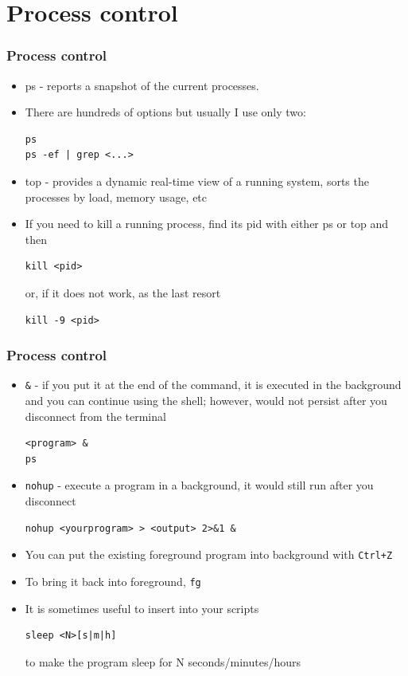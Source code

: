 \documentclass{beamer}
\begin{document}
\section{Process control}
\begin{frame}[fragile]
  \frametitle{Process control}
\begin{itemize}
\item  {\color{mycolorcli}ps} - reports a snapshot of the current processes.
\item There are hundreds of options but usually I use only two:
{\color{mycolorcli}
\begin{verbatim}
ps
ps -ef | grep <...>
\end{verbatim}
}
\item  {\color{mycolorcli}top} - provides a dynamic real-time view of a running system, sorts the processes by load, memory usage, etc
\item If you need to kill a running process, find its pid with either {\color{mycolorcli}ps} or 
{\color{mycolorcli}top} and then
{\color{mycolorcli}
\begin{verbatim}
kill <pid>
\end{verbatim}
}
or, if it does not work, as the last resort 
{\color{mycolorcli}
\begin{verbatim}
kill -9 <pid>
\end{verbatim}
}
\end{itemize}
\end{frame}

\begin{frame}[fragile]
  \frametitle{Process control}
\begin{itemize}
\item {\color{mycolorcli}\verb|&|} - if you put it at the end of the command, it is executed in the background and you can continue using the shell; however, would not persist after you disconnect from the terminal
{\color{mycolorcli}
\begin{verbatim}
<program> &
ps
\end{verbatim}
}
\item {\color{mycolorcli}\verb|nohup|}  - execute a program in a background, it would still run after you disconnect
{\color{mycolorcli}
\begin{verbatim}
nohup <yourprogram> > <output> 2>&1 &
\end{verbatim}
}

\item You can put the existing foreground program into background with  {\color{mycolorcli}\verb|Ctrl+Z|}
\item To bring it back into foreground,  {\color{mycolorcli}\verb|fg|}
\item It is sometimes useful to insert into your scripts 
{\color{mycolorcli}
\begin{verbatim}
sleep <N>[s|m|h]
\end{verbatim}
}
to make the program sleep for N seconds/minutes/hours
\end{itemize}
\end{frame}
\end{document}

